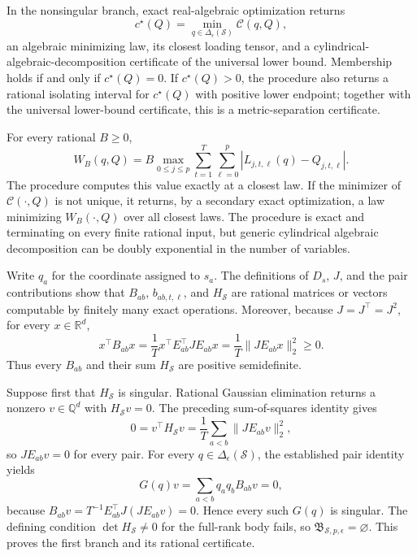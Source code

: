In the nonsingular branch, exact real-algebraic optimization returns
\[
 c^{\star}(Q)=\min_{q\in\Delta_{\epsilon}(\mathcal S)}\mathcal C(q,Q),
\]
an algebraic minimizing law, its closest loading tensor, and a cylindrical-algebraic-decomposition certificate of the universal lower bound.  Membership holds if and only if \(c^{\star}(Q)=0\).  If \(c^{\star}(Q)>0\), the procedure also returns a rational isolating interval for \(c^{\star}(Q)\) with positive lower endpoint; together with the universal lower-bound certificate, this is a metric-separation certificate.

For every rational \(B\geq0\),
\[
 W_B(q,Q)
 =B\max_{0\leq j\leq p}
       \sum_{t=1}^T\sum_{\ell=0}^p
       |L_{j,t,\ell}(q)-Q_{j,t,\ell}|.
\]
The procedure computes this value exactly at a closest law.  If the minimizer of \(\mathcal C(\cdot,Q)\) is not unique, it returns, by a secondary exact optimization, a law minimizing \(W_B(\cdot,Q)\) over all closest laws.  The procedure is exact and terminating on every finite rational input, but generic cylindrical algebraic decomposition can be doubly exponential in the number of variables.

Write \(q_a\) for the coordinate assigned to \(s_a\).  The definitions of \(D_s\), \(J\), and the pair contributions show that \(B_{ab}\), \(b_{ab,t,\ell}\), and \(H_{\mathcal S}\) are rational matrices or vectors computable by finitely many exact operations.  Moreover, because \(J=J^{\top}=J^2\), for every \(x\in\mathbb R^d\),
\[
 x^{\top}B_{ab}x
 =\frac1T x^{\top}E_{ab}^{\top}JE_{ab}x
 =\frac1T\lVert JE_{ab}x\rVert_2^2\geq0.
\]
Thus every \(B_{ab}\) and their sum \(H_{\mathcal S}\) are positive semidefinite.

Suppose first that \(H_{\mathcal S}\) is singular.  Rational Gaussian elimination returns a nonzero \(v\in\mathbb Q^d\) with \(H_{\mathcal S}v=0\).  The preceding sum-of-squares identity gives
\[
 0=v^{\top}H_{\mathcal S}v
 =\frac1T\sum_{a<b}\lVert JE_{ab}v\rVert_2^2,
\]
so \(JE_{ab}v=0\) for every pair.  For every \(q\in\Delta_{\epsilon}(\mathcal S)\), the established pair identity yields
\[
 G(q)v=\sum_{a<b}q_aq_bB_{ab}v=0,
\]
because \(B_{ab}v=T^{-1}E_{ab}^{\top}J(JE_{ab}v)=0\).  Hence every such \(G(q)\) is singular.  The defining condition \(\det H_{\mathcal S}\neq0\) for the full-rank body fails, so \(\mathfrak B_{\mathcal S,p,\epsilon}=\varnothing\).  This proves the first branch and its rational certificate.

